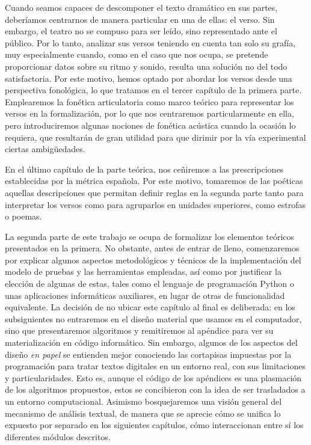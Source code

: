 Cuando seamos capaces de descomponer el texto dramático en sus partes, deberíamos centrarnos de manera particular en una de ellas: el verso. Sin embargo, el teatro no se compuso para ser leído, sino representado ante el público. Por lo tanto, analizar sus versos teniendo en cuenta tan solo su grafía, muy especialmente cuando, como en el caso que nos ocupa, se pretende proporcionar datos sobre su ritmo y sonido, resulta una solución no del todo satisfactoria. Por este motivo, hemos optado por abordar los versos desde una perspectiva fonológica, lo que tratamos en el tercer capítulo de la primera parte. Emplearemos la fonética articulatoria como marco teórico para representar los versos en la formalización, por lo que nos centraremos particularmente en ella, pero introduciremos algunas nociones de fonética acústica cuando la ocasión lo requiera, que resultarán de gran utilidad para que dirimir por la vía experimental ciertas ambigüedades. 

En el último capítulo de la parte teórica, nos ceñiremos a las prescripciones establecidas por la métrica española. Por este motivo, tomaremos de las poéticas aquellas descripciones que permitan definir reglas en la segunda parte tanto para interpretar los versos como para agruparlos en unidades superiores, como estrofas o poemas. 

La segunda parte de este trabajo se ocupa de formalizar los elementos teóricos presentados en la primera. No obstante, antes de entrar de lleno, comenzaremos por explicar algunos aspectos metodológicos y técnicos de la implementación del modelo de pruebas y las herramientas empleadas, así como por justificar la elección de algunas de estas, tales como el lenguaje de programación Python o unas aplicaciones informáticas auxiliares, en lugar de otras de funcionalidad equivalente. La decisión de no ubicar este capítulo al final es deliberada: en los subsiguientes no entraremos en el diseño material que usamos en el computador, sino que presentaremos algoritmos y remitiremos al apéndice para ver su materialización en código informático. Sin embargo, algunos de los aspectos del  diseño \textit{en papel} se entienden mejor conociendo las cortapisas impuestas por la programación para tratar textos digitales en un entorno real, con sus limitaciones y particularidades. Esto es, aunque el código de los apéndices es una plasmación de los algoritmos propuestos, estos se concibieron con la idea de ser trasladados a un entorno computacional. Asimismo bosquejaremos una visión general del mecanismo de análisis textual, de manera que se aprecie cómo se unifica lo expuesto por separado en los siguientes capítulos, cómo interaccionan entre sí los diferentes módulos descritos.

